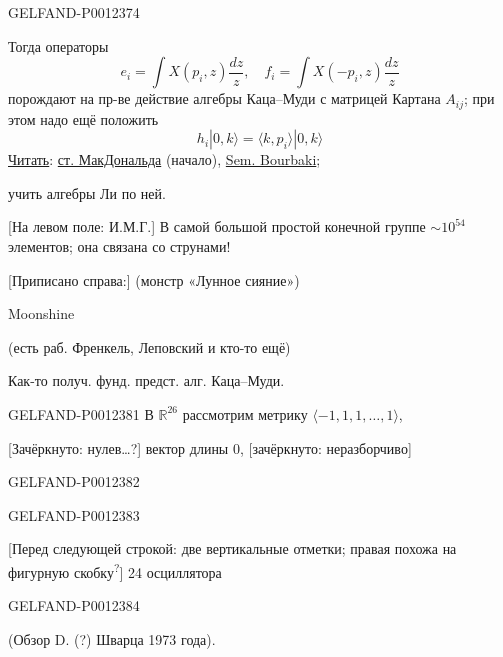 \begin{GelfandAdjacentEvidence}{GELFAND-P001237}{4}


\end{GelfandAdjacentEvidence}


Тогда операторы
\begin{equation*}
e_i=\int X(p_i,z)\frac{dz}{z},\quad f_i=\int X(-p_i,z)\frac{dz}{z}
\tag{12}
\end{equation*}
порождают на пр-ве действие алгебры Каца–Муди с матрицей Картана $A_{ij}$; при этом надо ещё положить
\begin{equation*}
h_i|0,k\rangle=\langle k,p_i\rangle|0,k\rangle
\tag{13}
\end{equation*}
\underline{Читать}: \underline{ст. МакДональда} (начало), \underline{Sem. Bourbaki};

учить алгебры Ли по ней.

[На левом поле: И.М.Г.] В самой большой простой конечной группе $\sim10^{54}$ элементов; она связана со струнами!

[Приписано справа:] (монстр «Лунное сияние»)

Moonshine

(есть раб. Френкель, Леповский и кто-то ещё)

Как-то получ. фунд. предст. алг. Каца–Муди.


\begin{GelfandAdjacentEvidence}{GELFAND-P001238}{1}
В $\mathbb R^{26}$ рассмотрим метрику $\langle-1,1,1,\ldots,1\rangle$,

[Зачёркнуто: нулев…?] вектор длины 0, [зачёркнуто: неразборчиво]
\end{GelfandAdjacentEvidence}
\begin{GelfandAdjacentEvidence}{GELFAND-P001238}{2}

\end{GelfandAdjacentEvidence}
\begin{GelfandAdjacentEvidence}{GELFAND-P001238}{3}


[Перед следующей строкой: две вертикальные отметки; правая похожа на фигурную скобку\textsuperscript{?}] 24 осциллятора
\end{GelfandAdjacentEvidence}
\begin{GelfandAdjacentEvidence}{GELFAND-P001238}{4}


(Обзор D. (?) Шварца 1973 года).
\end{GelfandAdjacentEvidence}


